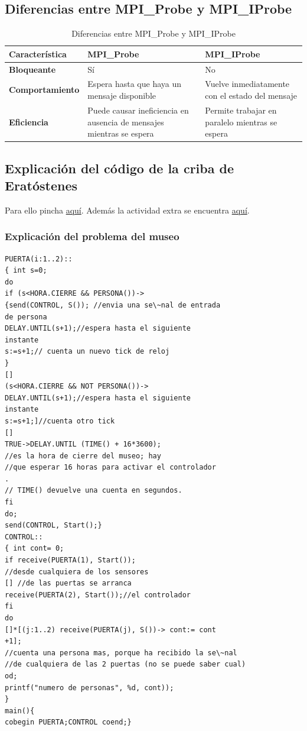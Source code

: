 \documentclass[a4paper,12pt]{article}
\begin{document}
\subsection*{Diferencias entre MPI\_Probe y MPI\_IProbe}

\begin{table}[ht]
\centering
\begin{tabular}{|p{5cm}|p{5cm}|p{5cm}|}
\hline
\textbf{Característica}        & \textbf{MPI\_Probe} & \textbf{MPI\_IProbe}  \\ \hline
\textbf{Bloqueante}           & Sí & No  \\ \hline
\textbf{Comportamiento}       & Espera hasta que haya un mensaje disponible & Vuelve inmediatamente con el estado del mensaje  \\ \hline
\textbf{Eficiencia}           & Puede causar ineficiencia en ausencia de mensajes mientras se espera & Permite trabajar en paralelo mientras se espera  \\ \hline
\end{tabular}
\caption{Diferencias entre MPI\_Probe y MPI\_IProbe}
\end{table}

\subsection{Explicación del código de la criba de Eratóstenes}

Para ello pincha \href{https://github.com/ElblogdeIsmael/ElblogdeIsmael.github.io/blob/main/Subjects/Third/SCD/Resumenes/ETSIIT/cribaExplicacion.md}{aquí}. Además la actividad extra se encuentra \href{https://github.com/ElblogdeIsmael/ElblogdeIsmael.github.io/blob/main/Subjects/Third/SCD/Teoria/Actividad_Extra/cribadeErastotenes/ETSIIT/build/Erastotenes.pdf}{aquí}.


\subsubsection{Explicación del problema del museo}

\begin{lstlisting}[style = customcpp]
    PUERTA(i:1..2)::
{ int s=0;
do
if (s<HORA.CIERRE && PERSONA())->
{send(CONTROL, S()); //envia una se\~nal de entrada
de persona
DELAY.UNTIL(s+1);//espera hasta el siguiente
instante
s:=s+1;// cuenta un nuevo tick de reloj
}
[]
(s<HORA.CIERRE && NOT PERSONA())->
DELAY.UNTIL(s+1);//espera hasta el siguiente
instante
s:=s+1;]//cuenta otro tick
[]
TRUE->DELAY.UNTIL (TIME() + 16*3600);
//es la hora de cierre del museo; hay
//que esperar 16 horas para activar el controlador
.
// TIME() devuelve una cuenta en segundos.
fi
do;
send(CONTROL, Start();}
CONTROL::
{ int cont= 0;
if receive(PUERTA(1), Start());
//desde cualquiera de los sensores
[] //de las puertas se arranca
receive(PUERTA(2), Start());//el controlador
fi
do
[]*[(j:1..2) receive(PUERTA(j), S())-> cont:= cont
+1];
//cuenta una persona mas, porque ha recibido la se\~nal
//de cualquiera de las 2 puertas (no se puede saber cual)
od;
printf("numero de personas", %d, cont));
}
main(){
cobegin PUERTA;CONTROL coend;}
\end{lstlisting}
\end{document}
